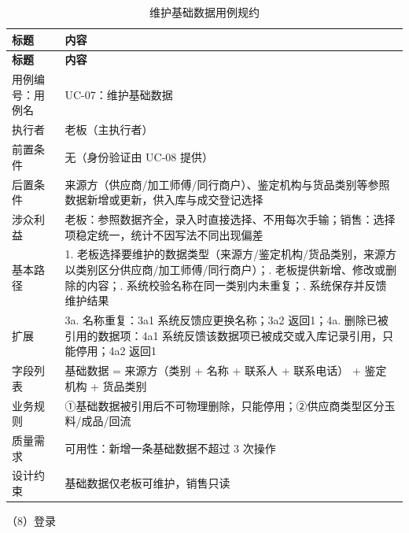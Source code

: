 \documentclass[12pt, a4paper]{ctexart}
\begin{document}
{\small
\begin{longtable}{@{}p{2.4cm} p{12.9cm}@{}}
\caption{维护基础数据用例规约}\label{tab:uc-07}\\
\toprule
\textbf{标题} & \textbf{内容} \\
\midrule
\endfirsthead
\toprule
\textbf{标题} & \textbf{内容} \\
\midrule
\endhead
用例编号：用例名 & UC-07：维护基础数据 \\
\midrule
执行者 & 老板（主执行者） \\
\midrule
前置条件 & 无（身份验证由 UC-08 提供） \\
\midrule
后置条件 & 来源方（供应商/加工师傅/同行商户）、鉴定机构与货品类别等参照数据新增或更新，供入库与成交登记选择 \\
\midrule
涉众利益 & 老板：参照数据齐全，录入时直接选择、不用每次手输；\newline 销售：选择项稳定统一，统计不因写法不同出现偏差 \\
\midrule
基本路径 & 1. 老板选择要维护的数据类型（来源方/鉴定机构/货品类别，来源方以类别区分供应商/加工师傅/同行商户）；\newline 2. 老板提供新增、修改或删除的内容；\newline 3. 系统校验名称在同一类别内未重复；\newline 4. 系统保存并反馈维护结果 \\
\midrule
扩展 & 3a. 名称重复：3a1 系统反馈应更换名称；3a2 返回1；\newline 4a. 删除已被引用的数据项：4a1 系统反馈该数据项已被成交或入库记录引用，只能停用；4a2 返回1 \\
\midrule
字段列表 & 基础数据 = 来源方（类别 + 名称 + 联系人 + 联系电话） + 鉴定机构 + 货品类别 \\
\midrule
业务规则 & ①基础数据被引用后不可物理删除，只能停用；\newline ②供应商类型区分玉料/成品/回流 \\
\midrule
质量需求 & 可用性：新增一条基础数据不超过 3 次操作 \\
\midrule
设计约束 & 基础数据仅老板可维护，销售只读 \\
\midrule
\bottomrule
\end{longtable}}
\noindent（8）登录
\end{document}
